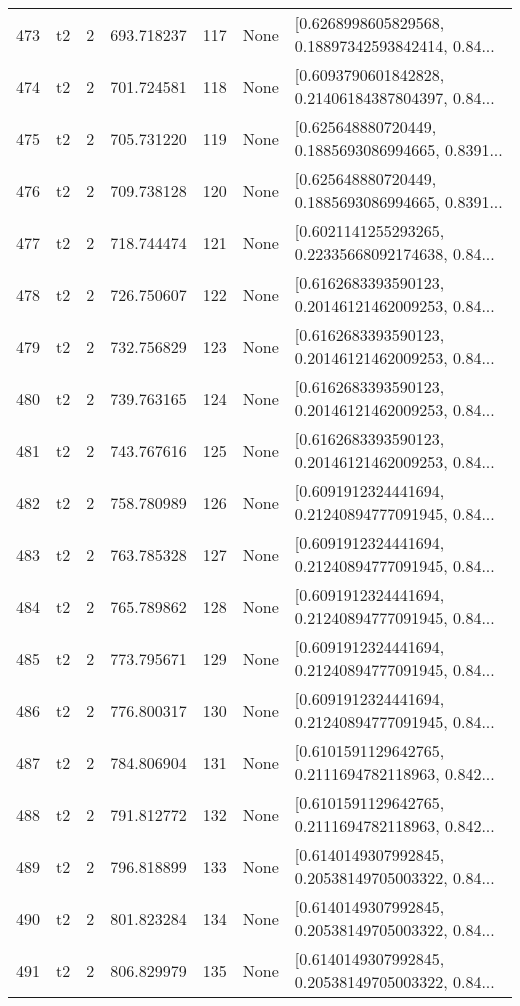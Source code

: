 \begin{tabular}{lllrlll}
473 &  t2 &   2 &   693.718237 &  117 &  None &  [0.6268998605829568, 0.18897342593842414, 0.84... \\
474 &  t2 &   2 &   701.724581 &  118 &  None &  [0.6093790601842828, 0.21406184387804397, 0.84... \\
475 &  t2 &   2 &   705.731220 &  119 &  None &  [0.625648880720449, 0.1885693086994665, 0.8391... \\
476 &  t2 &   2 &   709.738128 &  120 &  None &  [0.625648880720449, 0.1885693086994665, 0.8391... \\
477 &  t2 &   2 &   718.744474 &  121 &  None &  [0.6021141255293265, 0.22335668092174638, 0.84... \\
478 &  t2 &   2 &   726.750607 &  122 &  None &  [0.6162683393590123, 0.20146121462009253, 0.84... \\
479 &  t2 &   2 &   732.756829 &  123 &  None &  [0.6162683393590123, 0.20146121462009253, 0.84... \\
480 &  t2 &   2 &   739.763165 &  124 &  None &  [0.6162683393590123, 0.20146121462009253, 0.84... \\
481 &  t2 &   2 &   743.767616 &  125 &  None &  [0.6162683393590123, 0.20146121462009253, 0.84... \\
482 &  t2 &   2 &   758.780989 &  126 &  None &  [0.6091912324441694, 0.21240894777091945, 0.84... \\
483 &  t2 &   2 &   763.785328 &  127 &  None &  [0.6091912324441694, 0.21240894777091945, 0.84... \\
484 &  t2 &   2 &   765.789862 &  128 &  None &  [0.6091912324441694, 0.21240894777091945, 0.84... \\
485 &  t2 &   2 &   773.795671 &  129 &  None &  [0.6091912324441694, 0.21240894777091945, 0.84... \\
486 &  t2 &   2 &   776.800317 &  130 &  None &  [0.6091912324441694, 0.21240894777091945, 0.84... \\
487 &  t2 &   2 &   784.806904 &  131 &  None &  [0.6101591129642765, 0.2111694782118963, 0.842... \\
488 &  t2 &   2 &   791.812772 &  132 &  None &  [0.6101591129642765, 0.2111694782118963, 0.842... \\
489 &  t2 &   2 &   796.818899 &  133 &  None &  [0.6140149307992845, 0.20538149705003322, 0.84... \\
490 &  t2 &   2 &   801.823284 &  134 &  None &  [0.6140149307992845, 0.20538149705003322, 0.84... \\
491 &  t2 &   2 &   806.829979 &  135 &  None &  [0.6140149307992845, 0.20538149705003322, 0.84... \\

\end{tabular}
